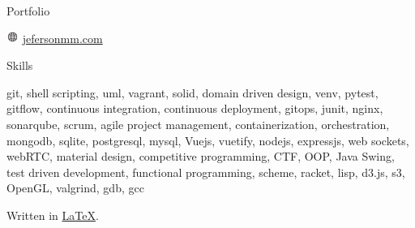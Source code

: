 \documentclass{cv} %
\def\iconsize{0.4cm}
\begin{document}
\begin{minipage}[b][0.9\paperheight][t]{0.29\linewidth}
\begin{rSection}{Portfolio}
    \item[]\includegraphics[width=\iconsize, trim={0cm 0.12cm 0.03cm 0cm}]{website.png}
        \href{http://jefersonmm.com}{jefersonmm.com}
\end{rSection}

\begin{rSection}{Skills}
    \item[] git, shell scripting, uml, vagrant, solid, domain driven design,
    venv, pytest, gitflow, continuous integration, continuous deployment,
    gitops, junit, nginx, sonarqube, scrum, agile project management, containerization,
    orchestration, 
    mongodb, sqlite, postgresql, mysql, %
    Vuejs, vuetify, nodejs, expressjs, web sockets, webRTC, material design, %
    competitive programming, CTF, OOP, Java Swing, test driven development,
    functional programming, scheme, racket, lisp, d3.js, s3, OpenGL, valgrind, gdb, gcc
\end{rSection}

Written in \href{https://github.com/JekxDevil/curriculum-vitae}{\LaTeX}.

\end{minipage}
\hspace{0.1cm}
\end{document}

